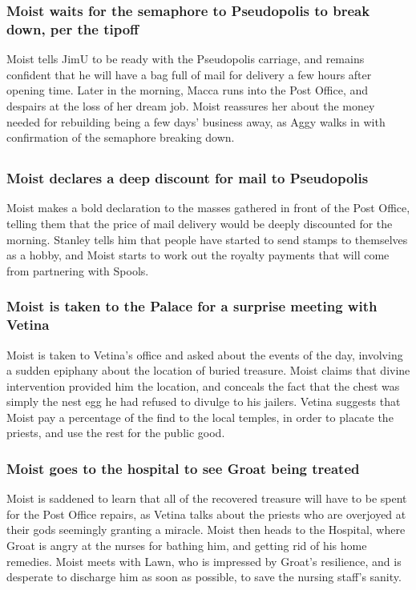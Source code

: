 \subsubsection{\Gls{Moist} waits for the semaphore to Pseudopolis to break down, per the tipoff}
\Gls{Moist} tells \Gls{JimU} to be ready with the Pseudopolis carriage, and remains confident that
he will have a bag full of mail for delivery a few hours after opening time. Later in the morning,
\Gls{Macca} runs into the Post Office, and despairs at the loss of her dream job. \Gls{Moist}
reassures her about the money needed for rebuilding being a few days' business away, as \Gls{Aggy}
walks in with confirmation of the semaphore breaking down.

\subsection{}
\subsubsection{\Gls{Moist} declares a deep discount for mail to Pseudopolis}
\Gls{Moist} makes a bold declaration to the masses gathered in front of the Post Office, telling
them that the price of mail delivery would be deeply discounted for the morning. \Gls{Stanley}
tells him that people have started to send stamps to themselves as a hobby, and \Gls{Moist} starts
to work out the royalty payments that will come from partnering with \Gls{Spools}.

\subsubsection{\Gls{Moist} is taken to the Palace for a surprise meeting with \Gls{Vetina}}
\Gls{Moist} is taken to \Gls{Vetina}'s office and asked about the events of the day, involving
a sudden epiphany about the location of buried treasure. \Gls{Moist} claims that divine intervention
provided him the location, and conceals the fact that the chest was simply the nest egg he had
refused to divulge to his jailers. \Gls{Vetina} suggests that \Gls{Moist} pay a percentage of the
find to the local temples, in order to placate the priests, and use the rest for the public good.

\subsubsection{\Gls{Moist} goes to the hospital to see \Gls{Groat} being treated}
\Gls{Moist} is saddened to learn that all of the recovered treasure will have to be spent for the
Post Office repairs, as \Gls{Vetina} talks about the priests who are overjoyed at their gods
seemingly granting a miracle. \Gls{Moist} then heads to the Hospital, where \Gls{Groat} is angry
at the nurses for bathing him, and getting rid of his home remedies. \Gls{Moist} meets with
\Gls{Lawn}, who is impressed by \Gls{Groat}'s resilience, and is desperate to discharge him as soon
as possible, to save the nursing staff's sanity.

